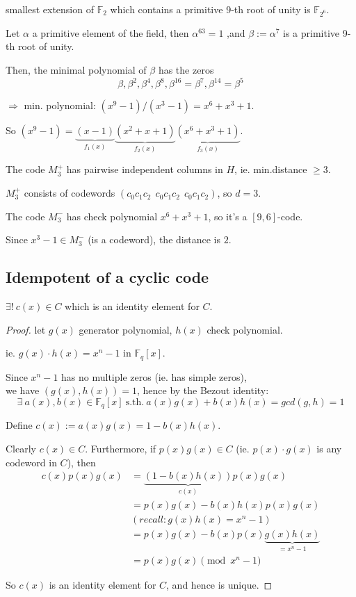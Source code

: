 \documentclass{article}
\theoremstyle{definition}
\newenvironment{thm}[1]
{\renewcommand\theinnerthm{#1}\innerthm}
{\endinnerthm}
\newenvironment{eg}[1]
{\renewcommand\theinnereg{#1}\innereg}
{\endinnereg}
\begin{document}
\begin{eg}{6.3.2}
  smallest extension of $\mathbb{F}_2$ which contains a primitive 9-th root of unity is $\mathbb{F}_{2^6}$.

  Let $\alpha$ a primitive element of the field, then $\alpha^63=1$ ,and $\beta := \alpha^7$ is a primitive 9-th root of unity.

  Then, the minimal polynomial of $\beta$ has the zeros
  $$\beta, \beta^2, \beta^4, \beta^8, \beta^{16}=\beta^7, \beta^{14}=\beta^5$$

  $\Longrightarrow$ min. polynomial: $(x^9 - 1)/(x^3 -1) = x^6 + x^3 + 1$.

  So $(x^9-1) = \underbrace{(x-1)}_{f_1(x)} \underbrace{(x^2+x+1)}_{f_2(x)} \underbrace{(x^6+x^3 + 1)}_{f_3(x)}$.

  The code $M_3^+$ has pairwise independent columns in $H$, ie. min.distance $\geq 3$.

  $M_3^+$ consists of codewords $(c_0 c_1 c_2 ~~ c_0 c_1 c_2 ~~ c_0 c_1 c_2)$, so $d=3$.

  The code $M_3^-$ has check polynomial $x^6 + x^3 + 1$, so it's a $[9, 6]$-code.

  Since $x^3-1 \in M_3^-$ (is a codeword), the distance is $2$.
\end{eg}


\subsection{Idempotent of a cyclic code}

\begin{thm}{6.4.1}
  $\exists!~ c(x) \in C$ which is an identity element for $C$.
\end{thm}
\begin{proof}
  let $g(x)$ generator polynomial, $h(x)$ check polynomial.

  ie. $g(x) \cdot h(x) = x^n -1$ in $\mathbb{F}_q[x]$.

  Since $x^n -1$ has no multiple zeros (ie. has simple zeros),\\
  \hspace*{2em} we have $(g(x), h(x))=1$, hence by the Bezout identity:
  $$\exists~ a(x), b(x) \in \mathbb{F}_q[x] ~\text{s.th.}~ a(x) g(x) + b(x) h(x) = gcd(g, h)=1$$

  Define $c(x) := a(x) g(x) = 1-b(x) h(x)$.

  Clearly $c(x) \in C$. Furthermore, if $p(x) g(x) \in C$ (ie. $p(x)\cdot g(x)$ is any codeword in $C$), then
  \begin{align*}
    c(x) p(x) g(x) &= \underbrace{(1-b(x)h(x))}_{c(x)} p(x) g(x)\\
                   &= p(x)g(x) - b(x)h(x)p(x)g(x)\\
                   &(recall: g(x)h(x)=x^n-1)\\
                   &= p(x) g(x) - b(x) p(x) \underbrace{g(x) h(x)}_{=x^n-1}\\
                   &= p(x) g(x) \pmod{x^n -1}
  \end{align*}

  So $c(x)$ is an identity element for $C$, and hence is unique.
\end{proof}
\end{document}
